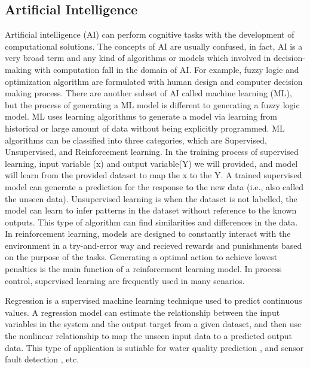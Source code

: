\subsection{Artificial Intelligence}
Artificial intelligence (AI) can perform cognitive tasks with the development of computational solutions. The concepts of AI are usually confused, in fact, AI is a very broad term and any kind of algorithms or models which involved in decision-making with computation fall in the domain of AI. For example, fuzzy logic and optimization algorithm are formulated with human design and computer decision making process. There are another subset of AI called machine learning (ML), but the process of generating a ML model is different to generating a fuzzy logic model. ML uses learning algorithms to generate a model via learning from historical or large amount of data without being explicitly programmed. ML algorithms can be classified into three categories, which are Supervised, Unsupervised, and Reinforcement learning. In the training process of supervised learning, input variable (x) and output variable(Y) we will provided, and model will learn from the provided dataset to map the x to the Y. A trained supervised model can generate a prediction for the response to the new data (i.e., also called the unseen data). Unsupervised learning is when the dataset is not labelled, the model can learn to infer patterns in the dataset without reference to the known outputs. This type of algorithm can find similarities and differences in the data. In reinforcement learning, models are designed to constantly interact with the environment in a try-and-error way and recieved rewards and punishments based on the purpose of the tasks. Generating a optimal action to achieve lowest penalties is the main function of a reinforcement learning model. In process control, supervised learning are frequently used in many senarios.

Regression is a supervised machine learning technique used to predict continuous values. A regression model can estimate the relationship between the input variables in the system and the output target from a given dataset, and then use the nonlinear relationship to map the unseen input data to a predicted output data. This type of application is sutiable for water quality prediction  \citep{librantzArtificialNeuralNetworks2018}, and sensor fault detection \citep{cecconiSoftSensingOnLine2021}, etc. 

